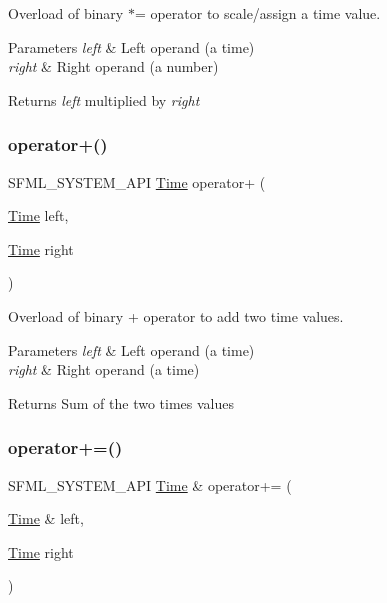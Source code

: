Overload of binary $\ast$= operator to scale/assign a time value. 


\begin{DoxyParams}{Parameters}
{\em left} & Left operand (a time) \\
\hline
{\em right} & Right operand (a number)\\
\hline
\end{DoxyParams}
\begin{DoxyReturn}{Returns}
{\itshape left} multiplied by {\itshape right} 
\end{DoxyReturn}
\mbox{\label{classsf_1_1_time_a7155e965f238f8c32d63649b0189ef47}} 
\subsubsection{\texorpdfstring{operator+()}{operator+()}}
{\footnotesize\ttfamily S\+F\+M\+L\+\_\+\+S\+Y\+S\+T\+E\+M\+\_\+\+A\+PI \hyperlink{classsf_1_1_time}{Time} operator+ (\begin{DoxyParamCaption}\item[{\hyperlink{classsf_1_1_time}{Time}}]{left,  }\item[{\hyperlink{classsf_1_1_time}{Time}}]{right }\end{DoxyParamCaption})\hspace{0.3cm}{\ttfamily [related]}}



Overload of binary + operator to add two time values. 


\begin{DoxyParams}{Parameters}
{\em left} & Left operand (a time) \\
\hline
{\em right} & Right operand (a time)\\
\hline
\end{DoxyParams}
\begin{DoxyReturn}{Returns}
Sum of the two times values 
\end{DoxyReturn}
\mbox{\label{classsf_1_1_time_a831c8df4b7b9b47eaa0c5a52a1be654c}} 
\subsubsection{\texorpdfstring{operator+=()}{operator+=()}}
{\footnotesize\ttfamily S\+F\+M\+L\+\_\+\+S\+Y\+S\+T\+E\+M\+\_\+\+A\+PI \hyperlink{classsf_1_1_time}{Time} \& operator+= (\begin{DoxyParamCaption}\item[{\hyperlink{classsf_1_1_time}{Time} \&}]{left,  }\item[{\hyperlink{classsf_1_1_time}{Time}}]{right }\end{DoxyParamCaption})\hspace{0.3cm}{\ttfamily [related]}}



